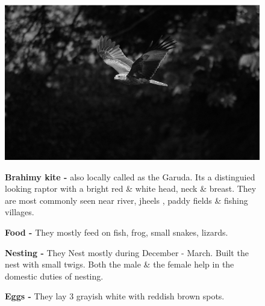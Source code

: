 \vfill\eject

~\phantom{a}
\vfill

\begin{figure}[H]
\begin{center}
\includegraphics{figure/Land_birds/01_pariah_kite/pariah-kite.eps}
\end{center}
\medskip
\noindent
{\bf Brahimy kite -} also locally called as the Garuda. Its a distinguied looking raptor with a bright red \& white head, neck \& breast. They  are most commonly seen near river, jheels , paddy fields \& fishing villages.

\medskip

{\bf Food -} They mostly feed on fish, frog, small snakes, lizards. 

{\bf Nesting -} They Nest mostly during December - March. Built the nest with small twigs. Both  the male \& the female help in the domestic duties of nesting. 

{\bf Eggs -} They lay 3 grayish white with reddish brown spots.
\end{figure}

\vfill\eject

~\phantom{a}
\vfill

